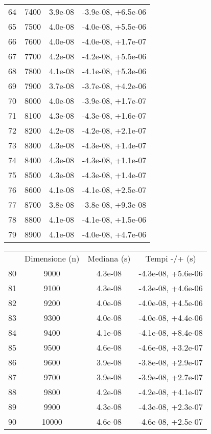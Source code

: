 \begin{table}
\begin{adjustbox}{width=1\textwidth/2}
\begin{tabular}{|c|c|c|c|}
\cline{1-4}
64 & 7400 & 3.9e-08 & -3.9e-08, +6.5e-06 \\
\cline{1-4}
65 & 7500 & 4.0e-08 & -4.0e-08, +5.5e-06 \\
\cline{1-4}
66 & 7600 & 4.0e-08 & -4.0e-08, +1.7e-07 \\
\cline{1-4}
67 & 7700 & 4.2e-08 & -4.2e-08, +5.5e-06 \\
\cline{1-4}
68 & 7800 & 4.1e-08 & -4.1e-08, +5.3e-06 \\
\cline{1-4}
69 & 7900 & 3.7e-08 & -3.7e-08, +4.2e-06 \\
\cline{1-4}
70 & 8000 & 4.0e-08 & -3.9e-08, +1.7e-07 \\
\cline{1-4}
71 & 8100 & 4.3e-08 & -4.3e-08, +1.6e-07 \\
\cline{1-4}
72 & 8200 & 4.2e-08 & -4.2e-08, +2.1e-07 \\
\cline{1-4}
73 & 8300 & 4.3e-08 & -4.3e-08, +1.4e-07 \\
\cline{1-4}
74 & 8400 & 4.3e-08 & -4.3e-08, +1.1e-07 \\
\cline{1-4}
75 & 8500 & 4.3e-08 & -4.3e-08, +1.4e-07 \\
\cline{1-4}
76 & 8600 & 4.1e-08 & -4.1e-08, +2.5e-07 \\
\cline{1-4}
77 & 8700 & 3.8e-08 & -3.8e-08, +9.3e-08 \\
\cline{1-4}
78 & 8800 & 4.1e-08 & -4.1e-08, +1.5e-06 \\
\cline{1-4}
79 & 8900 & 4.1e-08 & -4.0e-08, +4.7e-06 \\
\cline{1-4}
\end{tabular}
\end{adjustbox}
\end{table}

\begin{table}
\centering
\begin{adjustbox}{width=1\textwidth/2}
\begin{tabular}{|c|c|c|c|}
\hline
 & Dimensione (n) & Mediana (s) & Tempi -/+ (s) \\
80 & 9000 & 4.3e-08 & -4.3e-08, +5.6e-06 \\
\cline{1-4}
81 & 9100 & 4.3e-08 & -4.3e-08, +4.6e-06 \\
\cline{1-4}
82 & 9200 & 4.0e-08 & -4.0e-08, +4.5e-06 \\
\cline{1-4}
83 & 9300 & 4.0e-08 & -4.0e-08, +4.4e-06 \\
\cline{1-4}
84 & 9400 & 4.1e-08 & -4.1e-08, +8.4e-08 \\
\cline{1-4}
85 & 9500 & 4.6e-08 & -4.6e-08, +3.2e-07 \\
\cline{1-4}
86 & 9600 & 3.9e-08 & -3.8e-08, +2.9e-07 \\
\cline{1-4}
87 & 9700 & 3.9e-08 & -3.9e-08, +2.7e-07 \\
\cline{1-4}
88 & 9800 & 4.2e-08 & -4.2e-08, +4.1e-07 \\
\cline{1-4}
89 & 9900 & 4.3e-08 & -4.3e-08, +2.3e-07 \\
\cline{1-4}
90 & 10000 & 4.6e-08 & -4.6e-08, +2.5e-07 \\
\cline{1-4}
\end{tabular}
\end{adjustbox}
\end{table}
